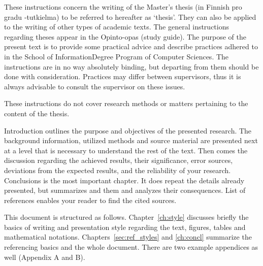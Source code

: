 \documentclass[12pt,a4paper,english
]{tunithesis}
\begin{document}



These instructions concern the writing of the Master’s thesis (in Finnish pro gradu ‑tutkielma) to be referred to hereafter as ‘thesis’.  They can also be applied to the writing of other types of academic texts.  The general instructions regarding theses appear in the Opinto-opas (study guide).  The purpose of the present text is to provide some practical advice and describe practices adhered to in the School of InformationDegree Program of Computer Sciences.  The instructions are in no way absolutely binding, but departing from them should be done with consideration.  Practices may differ between supervisors, thus it is always advisable to consult the supervisor on these issues.

These instructions do not cover research methods or matters pertaining to the content of the thesis.

Introduction outlines the purpose and objectives of the presented
research. The background information, utilized methods and source
material are presented next at a level that is necessary to understand
the rest of the text. Then comes the discussion regarding the achieved
results, their significance, error sources, deviations from the
expected results, and the reliability of your research. Conclusions is
the most important chapter. It does repeat the details already
presented, but summarizes and them and analyzes their
consequences. List of references enables your reader to find the cited
sources.


This document is structured as follows. Chapter~\ref{ch:style}
discusses briefly the basics of writing and presentation style
regarding the text, figures, tables and mathematical
notations. Chapters~\ref{sec:ref_styles} and \ref{ch:concl} summarize
the referencing basics and the whole document. There are two example
appendices as well (Appendix A and B).
\end{document}
